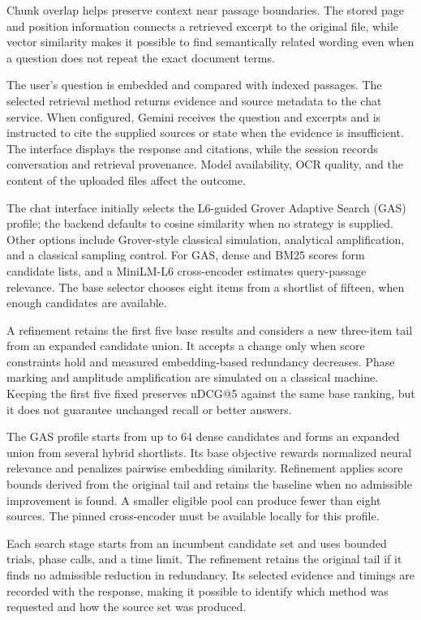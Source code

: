 \documentclass[11pt,a4paper]{article}
\newcommand{\reportsubheading}[1]{\par\vspace{2pt}{\normalsize\bfseries #1}\par}
\begin{document}
Chunk overlap helps preserve context near passage boundaries. The stored page and position information connects a retrieved excerpt to the original file, while vector similarity makes it possible to find semantically related wording even when a question does not repeat the exact document terms.

\reportsubheading{3.2 Question answering and provenance}
The user's question is embedded and compared with indexed passages. The selected retrieval method returns evidence and source metadata to the chat service. When configured, Gemini receives the question and excerpts and is instructed to cite the supplied sources or state when the evidence is insufficient. The interface displays the response and citations, while the session records conversation and retrieval provenance. Model availability, OCR quality, and the content of the uploaded files affect the outcome.

\reportsubheading{3.3 Evidence selection}
The chat interface initially selects the L6-guided Grover Adaptive Search (GAS) profile; the backend defaults to cosine similarity when no strategy is supplied. Other options include Grover-style classical simulation, analytical amplification, and a classical sampling control. For GAS, dense and BM25 scores form candidate lists, and a MiniLM-L6 cross-encoder estimates query-passage relevance. The base selector chooses eight items from a shortlist of fifteen, when enough candidates are available.

A refinement retains the first five base results and considers a new three-item tail from an expanded candidate union. It accepts a change only when score constraints hold and measured embedding-based redundancy decreases. Phase marking and amplitude amplification are simulated on a classical machine. Keeping the first five fixed preserves nDCG@5 against the same base ranking, but it does not guarantee unchanged recall or better answers.

The GAS profile starts from up to 64 dense candidates and forms an expanded union from several hybrid shortlists. Its base objective rewards normalized neural relevance and penalizes pairwise embedding similarity. Refinement applies score bounds derived from the original tail and retains the baseline when no admissible improvement is found. A smaller eligible pool can produce fewer than eight sources. The pinned cross-encoder must be available locally for this profile.

Each search stage starts from an incumbent candidate set and uses bounded trials, phase calls, and a time limit. The refinement retains the original tail if it finds no admissible reduction in redundancy. Its selected evidence and timings are recorded with the response, making it possible to identify which method was requested and how the source set was produced.
\end{document}
